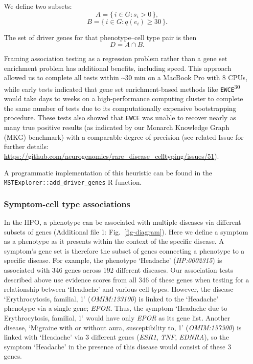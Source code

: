\documentclass[
]{article}
\begin{document}
We define two subsets: \[
A = \{\, i \in G : s_i > 0 \,\},
\] \[
B = \{\, i \in G : q(e_i) \ge 30 \,\}.
\]

The set of driver genes for that phenotype--cell type pair is then \[
D = A \cap B.
\]

Framing association testing as a regression problem rather than a gene
set enrichment problem has additional benefits, including speed. This
approach allowed us to complete all tests within \textasciitilde30 min
on a MacBook Pro with 8 CPUs, while early tests indicated that gene set
enrichment-based methods like \texttt{EWCE}\textsuperscript{30} would
take days to weeks on a high-performance computing cluster to complete
the same number of tests due to its computationally expensive
bootstrapping procedure. These tests also showed that \texttt{EWCE} was
unable to recover nearly as many true positive results (as indicated by
our Monarch Knowledge Graph (MKG) benchmark) with a comparable degree of
precision (see related Issue for further details:
\url{https://github.com/neurogenomics/rare_disease_celltyping/issues/51}).

A programmatic implementation of this heuristic can be found in the
\texttt{MSTExplorer::add\_driver\_genes} R function.

\subsubsection{Symptom-cell type
associations}\label{symptom-cell-type-associations}

In the HPO, a phenotype can be associated with multiple diseases via
different subsets of genes (Additional file 1: Fig.~\ref{fig-diagram}).
Here we define a symptom as a phenotype as it presents within the
context of the specific disease. A symptom's gene set is therefore the
subset of genes connecting a phenotype to a specific disease. For
example, the phenotype `Headache' (\emph{HP:0002315}) is associated with
346 genes across 192 different diseases. Our association tests described
above use evidence scores from all 346 of these genes when testing for a
relationship between `Headache' and various cell types. However, the
disease `Erythrocytosis, familial, 1' (\emph{OMIM:133100}) is linked to
the `Headache' phenotype via a single gene; \emph{EPOR}. Thus, the
symptom `Headache due to Erythrocytosis, familial, 1' would have only
\emph{EPOR} as its gene list. Another disease, `Migraine with or without
aura, susceptibility to, 1' (\emph{OMIM:157300}) is linked with
`Headache' via 3 different genes (\emph{ESR1}, \emph{TNF},
\emph{EDNRA}), so the symptom `Headache' in the presence of this disease
would consist of these 3 genes.
\end{document}
